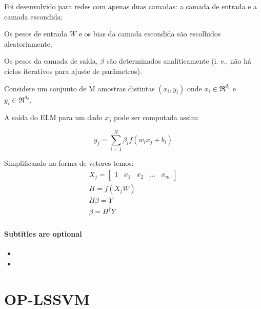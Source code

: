 \documentclass{beamer}
\begin{document}
\begin{frame}
Foi desenvolvido para redes com apenas
duas camadas: a camada de entrada e a
camada escondida;

Os pesos de entrada $W$ e os bias da camada
escondida são escolhidos aleatoriamente;

Os pesos da camada de saída, $\beta$ são
determinados analiticamente (i. e., não há
ciclos iterativos para ajuste de parâmetros).


\end{frame}

\begin{frame}
	Considere um conjunto de M amostras distintas $(x_i,y_i)$ onde $x_i \in
	\Re^{d_1}$ e $y_i \in \Re^{d_2}$.
	
	A saída do ELM para um dado $x_j$ pode ser computada assim:
	
	\begin{equation}
	y_j= \sum_{i=1}^{N} \beta_i f(w_i x_j + b_i)
	\end{equation}
	
	Simplificando na forma de vetores temos:
	\begin{align}
		X_j = \begin{bmatrix}
					 1 & x_1 & x_2 & ...& x_m
			  \end{bmatrix} \\
		H = f(X_j W)\\
		H \beta  = Y \\
		\beta = H^{\dagger} Y
	\end{align}
\end{frame}


\begin{frame}
	\frametitle{}
	\framesubtitle{Subtitles are optional}
	
	\begin{itemize}
	  \item
	  \item
	\end{itemize}
\end{frame}



\section{OP-LSSVM}
\end{document}
